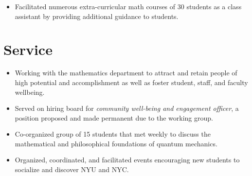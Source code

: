\documentclass{cultvoucher}
\begin{document}
\begin{itemize}
	\item Facilitated numerous extra-curricular math courses of 30 students as a class assistant by providing additional guidance to students.
\end{itemize}

\section{Service}

\begin{itemize}
	\item Working with the mathematics department to attract and retain people of high potential and accomplishment as well as foster student, staff, and faculty wellbeing.
	\item Served on hiring board for \emph{community well-being and engagement officer}, a position proposed and made permanent due to the working group.
\end{itemize}

\begin{itemize}
	\item Co-organized group of 15 students that met weekly to discuss the mathematical and philosophical foundations of quantum mechanics.
\end{itemize}

\begin{itemize}
	\item Organized, coordinated, and facilitated events encouraging new students to socialize and discover NYU and NYC.
\end{itemize}
\end{document}
